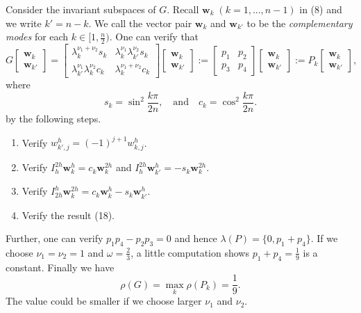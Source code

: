 \documentclass{SBCbookchapter}
\begin{document}
Consider the invariant subspaces of $G$. Recall $\mathbf{w}_k\;(k=1,...,n-1)$ in (8) and we write $k'=n-k$. We call the vector pair $\mathbf{w}_k$ and $\mathbf{w}_{k'}$ to be the \textit{complementary modes} for each $k\in[1,\frac{n}{2})$. One can verify that
\begin{equation}
	G\begin{bmatrix}
		\mathbf{w}_k\\
		\mathbf{w}_{k'}
	\end{bmatrix}=
	\begin{bmatrix}
		\lambda_k^{\nu_1+\nu_2}s_k & \lambda_k^{\nu_1}\lambda_{k'}^{\nu_2}s_k\\
		\lambda_{k'}^{\nu_1}\lambda_{k}^{\nu_2}c_k & \lambda_k^{\nu_1+\nu_2}c_k
	\end{bmatrix}
	\begin{bmatrix}
		\mathbf{w}_k\\
		\mathbf{w}_{k'}
	\end{bmatrix}:=
	\begin{bmatrix}
		p_1 & p_2\\
		p_3 & p_4
	\end{bmatrix}
	\begin{bmatrix}
		\mathbf{w}_k\\
		\mathbf{w}_{k'}
	\end{bmatrix}:=P_k
	\begin{bmatrix}
		\mathbf{w}_k\\
		\mathbf{w}_{k'}
	\end{bmatrix},
\end{equation}
where
\begin{equation}
	s_k=\sin^2\frac{k\pi}{2n},\quad \text{and} \quad c_k=\cos^2\frac{k\pi}{2n}.
\end{equation}
by the following steps.
\begin{enumerate}[STEP 1.]
	\item Verify $w_{k',j}^h=(-1)^{j+1}w_{k,j}^h$.
	\item Verify $I_h^{2h}\textbf{w}_k^h=c_k\mathbf{w}_k^{2h}$ and $I_h^{2h}\textbf{w}_{k'}^h=-s_k\mathbf{w}_k^{2h}$.
	\item Verify $I_{2h}^h \mathbf{w}_k^{2h}=c_k\mathbf{w}_k^h-s_k\mathbf{w}_{k'}^h$.
	\item Verify the result (18).
\end{enumerate}
Further, one can verify $p_1p_4-p_2p_3=0$ and hence $\lambda(P)=\{0,p_1+p_4\}$. If we choose $\nu_1=\nu_2=1$ and $\omega=\frac{2}{3}$, a little computation shows $p_1+p_4=\frac{1}{9}$ is a constant. Finally we have
\begin{equation}
	\rho(G)=\max_k \rho(P_k)=\frac{1}{9}.
\end{equation}
The value could be smaller if we choose larger $\nu_1$ and $\nu_2$.
\end{document}
